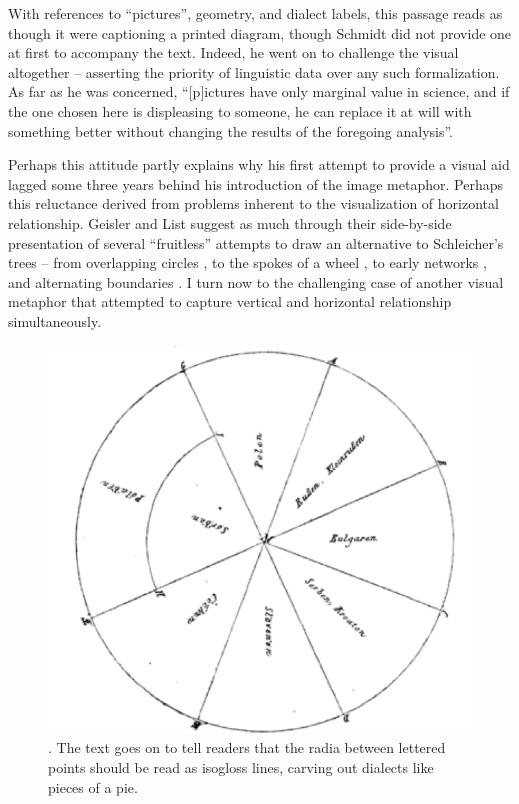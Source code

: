 \documentclass[output=paper]{langscibook}
\begin{document}
With references to ``pictures'', geometry, and dialect labels, this passage reads as though it were captioning a printed diagram, though Schmidt did not provide one at first to accompany the text. Indeed, he went on to challenge the visual altogether – asserting the priority of linguistic data over any such formalization. As far as he was concerned, ``[p]ictures have only marginal value in science, and if the one chosen here is displeasing to someone, he can replace it at will with something better without changing the results of the foregoing analysis''.

Perhaps this attitude partly explains why his first attempt to provide a visual aid lagged some three years behind his introduction of the image metaphor. Perhaps this reluctance derived from problems inherent to the visualization of horizontal relationship. Geisler and List suggest as much through their side-by-side presentation of several ``fruitless'' attempts to draw an alternative to Schleicher's trees – from overlapping circles \citep{Hirt1905}, to the spokes of a wheel \citep{Meillet1908}, to early networks \citep{bonfante1931}, and alternating boundaries \citep{Bloomfield1933}. I turn now to the challenging case of another visual metaphor that attempted to capture vertical and horizontal relationship simultaneously.

\begin{figure}
    \centering
    \includegraphics[scale=1]{figures/schmidt1875.png}
    \caption{\citet[199]{Schmidt1875}. The text goes on to tell readers that the radia between lettered points should be read as isogloss lines, carving out dialects like pieces of a pie.}
    \label{fig:kaplan:schmidt}
\end{figure}
\end{document}
